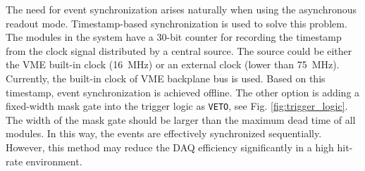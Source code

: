 \documentclass[number,5p]{elsarticle}
\begin{document}
The need for event synchronization arises naturally when using the asynchronous
readout mode.
Timestamp-based synchronization is used to solve this problem.
The modules in the system have a 30-bit counter for recording the timestamp from
the clock signal distributed by a central source.
The source could be either the VME built-in clock (\SI{16}{\MHz}) or an external clock
(lower than \SI{75}{\MHz}).
Currently, the built-in clock of VME backplane bus is used. 
Based on this timestamp, event synchronization is achieved offline.
The other option is adding a fixed-width mask gate into the trigger logic as \texttt{VETO}, see Fig. \ref{fig:trigger_logic}.
The width of the mask gate should be larger than the maximum dead time of all modules.
In this way, the events are effectively synchronized sequentially. 
However, this method may reduce the DAQ efficiency significantly in a high hit-rate environment.
\end{document}
